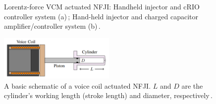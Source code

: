    \begin{figure}[!ht]
        \centering
        \qquad
        \caption[Lorentz-force VCM actuated NFJI: Handheld injector and cRIO controller system (a); Hand-held injector and charged capacitor amplifier/controller system (b).]{
            Lorentz-force VCM actuated NFJI: Handheld injector and cRIO controller system (a)\,\cite{taberner2006}; Hand-held injector and charged capacitor amplifier/controller system (b)\,\cite{ruddy2014}.
        }   \label{fig:chapter/background/vcm injectors}
    \end{figure}
    
    
    \begin{figure}[!ht]
      \centering
      \includegraphics[width=0.5\textwidth]{chap2/images/vcm_for_nfji.png}
      \caption[A basic schematic of a voice coil actuated NFJI. $L$ and $D$ are the cylinder’s working length (stroke length) and diameter, respectively.]{A basic schematic of a voice coil actuated \acs{NFJI}. $L$ and $D$ are the cylinder’s working length (stroke length) and diameter, respectively\,\cite{ruddy2014}.}
      \label{fig:chapter/background/vcm for nfji}
    \end{figure}
    
